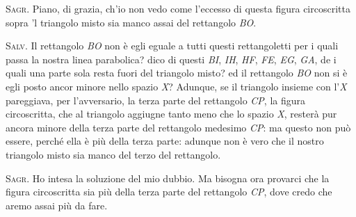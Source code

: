 \documentclass[11pt,twoside,openany]{book}
\newcommand{\speaker}[1]{\textcolor{rubric}{\textsc{#1}}\space}
\begin{document}
\speaker{Sagr.} Piano, di grazia, ch'io non vedo come l'eccesso di questa figura circoscritta sopra 'l triangolo misto sia manco assai del rettangolo \emph{BO}.

\speaker{Salv.} Il rettangolo \emph{BO} non è egli eguale a tutti questi rettangoletti per i quali passa la nostra linea parabolica? dico di questi \emph{BI}, \emph{IH}, \emph{HF}, \emph{FE}, \emph{EG}, \emph{GA}, de i quali una parte sola resta fuori del triangolo misto? ed il rettangolo \emph{BO} non si è egli posto ancor minore nello spazio \emph{X}? Adunque, se il triangolo insieme con l'\emph{X} pareggiava, per l'avversario, la terza parte del rettangolo \emph{CP}, la figura circoscritta, che al triangolo aggiugne tanto meno che lo spazio \emph{X}, resterà pur ancora minore della terza parte del rettangolo medesimo \emph{CP}: ma questo non può essere, perché ella è più della terza parte: adunque non è vero che il nostro triangolo misto sia manco del terzo del rettangolo.

\speaker{Sagr.} Ho intesa la soluzione del mio dubbio. Ma bisogna ora provarci che la figura circoscritta sia più della terza parte del rettangolo \emph{CP}, dove credo che aremo assai più da fare.
\end{document}
